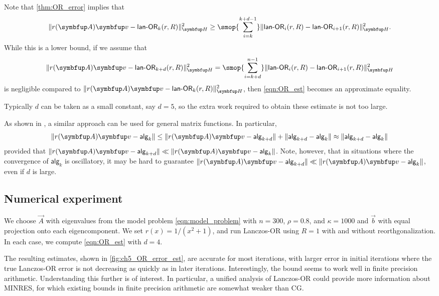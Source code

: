 Note that \cref{thm:OR_error} implies that
\begin{equation}
    \label{eqn:OR_est}
    \| r\A\vec{v} - \lanopt_k(r,R) \|_{\vec{H}}^2
    \geq \smop{\sum_{i=k}^{k+d-1}}
    \| \lanopt_{i}(r,R) - \lanopt_{i+1}(r,R) \|_{\vec{H}}^2.
\end{equation}
While this is a lower bound, if we assume that
\begin{equation*}
    \| r\A\vec{v} - \lanopt_{k+d}(r,R) \|_{\vec{H}}^2 = 
    \smop{\sum_{i=k+d}^{n-1}}
    \| \lanopt_{i}(r,R) - \lanopt_{i+1}(r,R) \|_{\vec{H}}^2
\end{equation*}
is negligible compared to \( \| r\A\vec{v} - \lanopt_k(r,R) \|_{\vec{H}}^2 \), then \cref{eqn:OR_est} becomes an approximate equality.

Typically $d$ can be taken as a small constant, say $d=5$, so the extra work required to obtain these estimate is not too large.

\begin{remark}
As shown in \cite{eshghi_reichel_21}, a similar approach can be used for general matrix functions. In particular, 
\begin{equation*}
    \| r\A\vec{v} - \mathsf{alg}_k \|
    \leq \| r\A\vec{v} - \mathsf{alg}_{k+d} \| + \| \mathsf{alg}_{k+d} - \mathsf{alg}_k \|
    \approx \| \mathsf{alg}_{k+d} - \mathsf{alg}_k \|
\end{equation*}
provided that \( \| r\A\vec{v} - \mathsf{alg}_{k+d} \| \ll \| r\A\vec{v} - \mathsf{alg}_k \| \).
    Note, however, that in situations where the convergence of \( \mathsf{alg}_k \) is oscillatory, it may be hard to guarantee \( \| r\A\vec{v} - \mathsf{alg}_{k+d} \| \ll \| r\A\vec{v} - \mathsf{alg}_k \| \), even if \( d \) is large.
\end{remark}



\subsection{Numerical experiment}

We choose \( \vec{A} \) with eigenvalues from the model problem \cref{eqn:model_problem} with \( n=300 \), \( \rho = 0.8 \), and \( \kappa = 1000 \) and \( \vec{b} \) with equal projection onto each eigencomponent.
We set \( r(x) = 1/(x^2+1) \), and run Lanczos-OR using \( R=1 \) with and without reorthgonalization.
In each case, we compute \cref{eqn:OR_est} with \( d=4 \).

The resulting estimates, shown in \cref{fig:ch5_OR_error_est}, are accurate for most iterations, with larger error in initial iterations where the true Lanczos-OR error is not decreasing as quickly as in later iterations.
Interestingly, the bound seems to work well in finite precision arithmetic.
Understanding this further is of interest.
In particular, a unified analysis of Lanczos-OR could provide more information about MINRES, for which existing bounds in finite precision arithmetic are somewhat weaker than CG.



